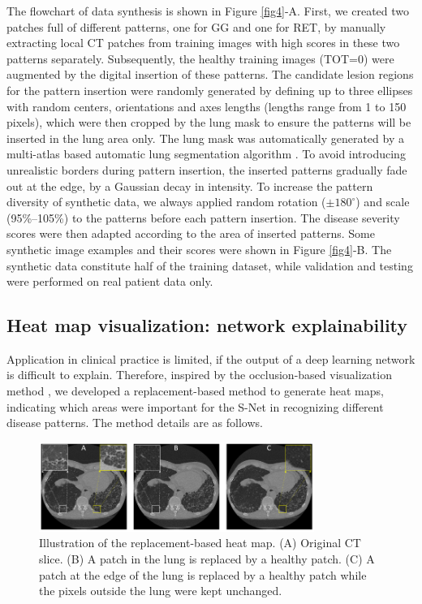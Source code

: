 The flowchart of data synthesis is shown in Figure \ref{fig4}-A. First, we created two patches full of different patterns, one for GG and one for RET, by manually extracting local CT patches from training images with high scores in these two patterns separately. Subsequently, the healthy training images (TOT=0) were augmented by the digital insertion of these patterns. The candidate lesion regions for the pattern insertion were randomly generated by defining up to three ellipses with random centers, orientations and axes lengths (lengths range from 1 to 150 pixels), which were then cropped by the lung mask to ensure the patterns will be inserted in the lung area only. The lung mask was automatically generated by a multi-atlas based automatic lung segmentation algorithm \cite{Zhai2019}. To avoid introducing unrealistic borders during pattern insertion, the inserted patterns gradually fade out at the edge, by a Gaussian decay in intensity. To increase the pattern diversity of synthetic data, we always applied random rotation ($\pm180^\circ$) and scale (95\%–105\%) to the patterns before each pattern insertion. The disease severity scores were then adapted according to the area of inserted patterns. Some synthetic image examples and their scores were shown in Figure \ref{fig4}-B. The synthetic data constitute half of the training dataset, while validation and testing were performed on real patient data only.

\subsection{Heat map visualization: network explainability}
Application in clinical practice is limited, if the output of a deep learning network is difficult to explain. Therefore, inspired by the occlusion-based visualization method \cite{zeiler2014visualizing}, we developed a replacement-based method to generate heat maps, indicating which areas were important for the S-Net in recognizing different disease patterns. The method details are as follows.


\begin{figure}[tb]
    \centering
    \includegraphics[width=0.8\textwidth]{figure5.png}
    \caption{Illustration of the replacement-based heat map. (A) Original CT slice. (B) A patch in the lung is replaced by a healthy patch. (C) A patch at the edge of the lung is replaced by a healthy patch while the pixels outside the lung were kept unchanged.}
    \label{fig5}
\end{figure}

